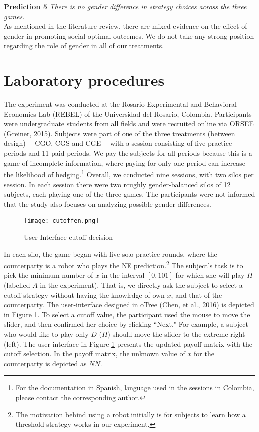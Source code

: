 \documentclass[12pt, letterpaper]{article}
\theoremstyle{plain}
\begin{document}
\noindent \textbf{Prediction 5}
\textit{There is no gender difference in strategy choices across the three games.}\\

As mentioned in the literature review, there are mixed evidence on the effect of gender in promoting social optimal outcomes. We do not take any strong position regarding the role of gender in all of our treatments. 


\section{Laboratory procedures}
\label{sec:game}

The experiment was conducted at the Rosario Experimental and Behavioral Economics Lab (REBEL) of the Universidad del Rosario, Colombia. Participants were undergraduate students from all fields and were recruited online via ORSEE (Greiner, 2015). Subjects were part of one of the three treatments (between design) ---CGO, CGS and CGE---  with  a session consisting of five practice periods and 11 paid periods. We pay the subjects for all periods because this is a game of incomplete information, where paying for only one period can increase the likelihood of hedging.\footnote{For the documentation in Spanish, language used in the sessions in Colombia, please contact the corresponding author.} Overall, we conducted nine sessions, with two silos per session. In each session there were two roughly gender-balanced silos of 12 subjects, each playing one of the three games. The participants were not informed that the study also focuses on analyzing possible gender differences.

\begin{center}
\begin{figure}[ht]
\centering{}%
\texttt{[image: cutoffen.png]}%
\caption{User-Interface cutoff decision} 
\label{fig:ui}
\end{figure}
\end{center}
In each silo, the game began with five solo practice rounds, where the counterparty is a robot who plays the NE prediction.\footnote{The motivation behind using a robot initially is for subjects to learn how a threshold strategy works in our experiment.} The subject's task is to pick the minimum number of $x$ in the interval $[0,101]$ for which she will play $H$ (labelled $A$ in the experiment). That is, we directly ask the subject to select a cutoff strategy without having the knowledge of own $x$, and that of the counterparty. The user-interface designed in oTree (Chen, et al., 2016) is depicted in Figure \ref{fig:ui}. To select a cutoff value, the participant used the mouse to move the slider, and then confirmed her choice by clicking ``Next." For example, a subject who would like to play only $D$ ($H$) should move the slider to the extreme right (left). The user-interface in Figure \ref{fig:ui} presents the updated payoff matrix with the cutoff selection. In the payoff matrix, the unknown value of $x$ for the counterparty is depicted as $NN$.
\end{document}
